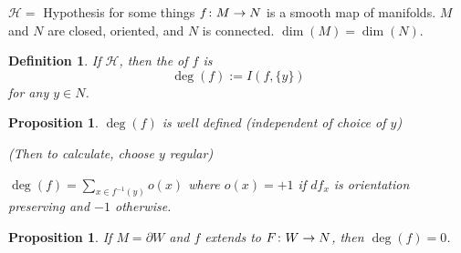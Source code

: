 \documentclass[11pt]{amsbook}
\theoremstyle{mystyle} %
\newtheorem{defi}[thm]{Definition}
\newtheorem{propo}[thm]{Proposition}
\numberwithin{thm}{section}
\renewcommand{\d}{\partial}
\begin{document}
$\mathcal{H} = $ Hypothesis for some things  $f \colon M \to N$ is a smooth map of manifolds.  $M$ and $N$ are closed, oriented, and $N$  is connected.  $\dim(M) = \dim(N)$.

\begin{defi}
	If $\mathcal{H}$, then the  of $f$ is $$\deg(f) := I(f, \{y\})$$ for any $y \in N$.
\end{defi}
\begin{propo}
	$\deg(f)$ is well defined (independent of choice of $y$)

	(Then to calculate, choose $y$ regular)

	$\deg(f) = \sum_{x \in f^{-1}(y)} o(x)$ where $o(x) = +1$ if
        $df_x$ is orientation preserving and \(-1\) otherwise.
\end{propo}
\begin{propo}
	If $M = \d W$ and $f$ extends to $F\colon W \to N$, then $\deg(f) = 0$.
\end{propo}
\end{document}
